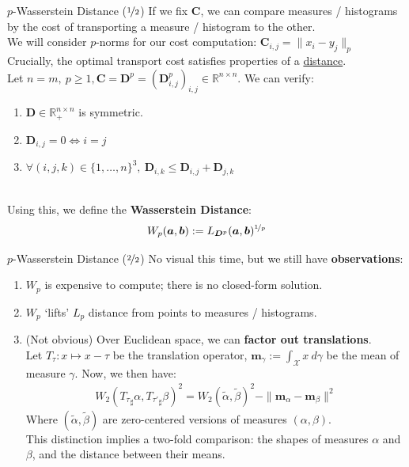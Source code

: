 \documentclass{beamer}
\begin{document}
\begin{frame}{$p$-Wasserstein Distance ($\nicefrac{1}{2}$)}
	If we fix $\bm{C}$, we can compare measures / histograms by the cost of transporting a measure / histogram to the other. \pause \newline \\
	
	We will consider $p$-norms for our cost computation: $\bm{C}_{i,j} = \| x_i  - y_j \|_p$ \pause \newline \\

	Crucially, the optimal transport cost satisfies properties of a \underline{distance}. \pause \newline \\

	Let $n = m,~p \geq 1, \bm{C} = \bm{D}^p = (\bm{D}^p_{i, j})_{i,j} \in \mathbb{R}^{n \times n}$. We can verify:
	\begin{enumerate}[label=\arabic*.]
		\item $\bm{D} \in \mathbb{R}^{n \times n}_+$ is symmetric. \pause
		\item $\bm{D}_{i,j} = 0 \iff i = j$ \pause
		\item $\forall (i, j, k) \in \{1, \ldots, n\}^3,~\bm{D}_{i,k} \leq \bm{D}_{i, j} + \bm{D}_{j, k}$ \pause
	\end{enumerate}
	~ \\
	Using this, we define the \textbf{Wasserstein Distance}:
	\begin{gather}
		W_p (\bm{a}, \bm{b}) := L_{\bm{D}^p}(\bm{a}, \bm{b})^{\nicefrac{1}{p}}
	\end{gather}
\end{frame}

\begin{frame}{$p$-Wasserstein Distance ($\nicefrac{2}{2}$)}
	No visual this time, but we still have \textbf{observations}:
	\begin{enumerate}[label=\arabic*.]
		\item $W_p$ is expensive to compute; there is no closed-form solution. \pause
		\item $W_p$ `lifts' $L_p$ distance from points to measures / histograms. \pause
		\item (Not obvious) Over Euclidean space, we can \textbf{factor out translations}. \pause \newline \\
			Let $T_\tau : x \mapsto x - \tau$ be the translation operator, $\bm{m}_\gamma := \int_{\mathcal{X}} x~d\gamma$ be the mean of measure $\gamma$. Now, we then have:
			\begin{gather}
				W_2({T_\tau}_{\sharp} \alpha, {T_{\tau'}}_{\sharp} \beta)^2 = W_2(\tilde{\alpha}, \tilde{\beta})^2 - \| \bm{m}_\alpha - \bm{m}_\beta \|^2
			\end{gather}
			Where $(\tilde{\alpha}, \tilde{\beta})$ are zero-centered versions of measures $(\alpha, \beta)$. \pause \newline \\
			This distinction implies a two-fold comparison: the shapes of measures $\alpha$ and $\beta$, and the distance between their means.
	\end{enumerate}
\end{frame}
\end{document}
